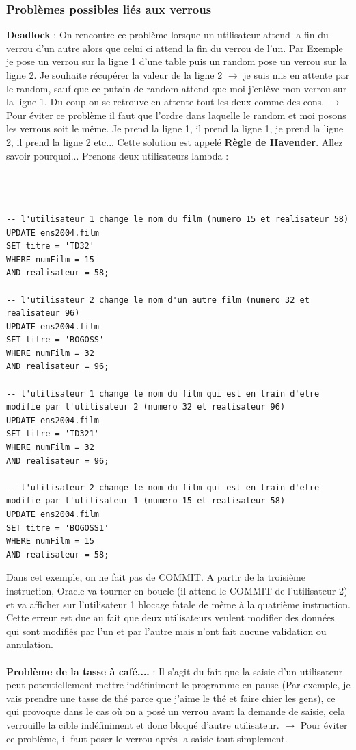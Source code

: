 \documentclass{report}
\begin{document}
\subsubsection{Problèmes possibles liés aux verrous}
\textbf{Deadlock} : On rencontre ce problème lorsque un utilisateur attend la fin du verrou d'un autre alors que celui ci attend la fin du verrou de l'un. 
\newline Par Exemple je pose un verrou sur la ligne 1 d'une table puis un random pose un verrou sur la ligne 2. Je souhaite récupérer la valeur de la ligne 2 $\rightarrow$ je suis mis en attente par le random, sauf que ce putain de random attend que moi j'enlève mon verrou sur la ligne 1. Du coup on se retrouve en attente tout les deux comme des cons.
$\rightarrow$ Pour éviter ce problème il faut que l'ordre dans laquelle le random et moi posons les verrous soit le même. Je prend la ligne 1, il prend la ligne 1, je prend la ligne 2, il prend la ligne 2 etc... Cette solution est appelé \textbf{Règle de Havender}. Allez savoir pourquoi...
\newline
Prenons deux utilisateurs lambda :\\\\\\\
\begin{lstlisting}[style=MySQLStyle]
-- l'utilisateur 1 change le nom du film (numero 15 et realisateur 58)
UPDATE ens2004.film
SET titre = 'TD32'
WHERE numFilm = 15
AND realisateur = 58;

-- l'utilisateur 2 change le nom d'un autre film (numero 32 et realisateur 96)
UPDATE ens2004.film
SET titre = 'BOGOSS'
WHERE numFilm = 32
AND realisateur = 96;

-- l'utilisateur 1 change le nom du film qui est en train d'etre modifie par l'utilisateur 2 (numero 32 et realisateur 96)
UPDATE ens2004.film
SET titre = 'TD321'
WHERE numFilm = 32
AND realisateur = 96;

-- l'utilisateur 2 change le nom du film qui est en train d'etre modifie par l'utilisateur 1 (numero 15 et realisateur 58)
UPDATE ens2004.film
SET titre = 'BOGOSS1'
WHERE numFilm = 15
AND realisateur = 58;
\end{lstlisting}

Dans cet exemple, on ne fait pas de COMMIT. A partir de la troisième instruction, Oracle va tourner en boucle (il attend le COMMIT de l'utilisateur 2) et va afficher sur l'utilisateur 1 blocage fatale de même à la quatrième instruction.
Cette erreur est due au fait que deux utilisateurs veulent modifier des données qui sont modifiés par l'un et par l'autre mais n'ont fait aucune validation ou annulation.\\\\
\textbf{Problème de la tasse à café....} : Il s'agit du fait que la saisie d'un utilisateur peut potentiellement mettre indéfiniment le programme en pause (Par exemple, je vais prendre une tasse de thé parce que j'aime le thé et faire chier les gens), ce qui provoque dans le cas où on a posé un verrou avant la demande de saisie, cela verrouille la cible indéfiniment et donc bloqué d'autre utilisateur.
$\rightarrow$ Pour éviter ce problème, il faut poser le verrou après la saisie tout simplement. 
\end{document}
